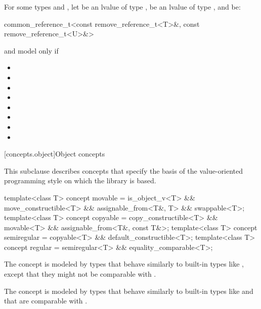 \begin{itemdescr}
\pnum
For some types  and ,
let  be an lvalue of type ,
 be an lvalue of type ,
and  be:
\begin{codeblock}
common_reference_t<const remove_reference_t<T>&, const remove_reference_t<U>&>
\end{codeblock}
 and  model
 only if

\begin{itemize}
\item {}
\item {}
\item {}
\item {}
\item {}
\item {}
\item {}
\item {}
\end{itemize}
\end{itemdescr}

[concepts.object]{Object concepts}

\pnum
This subclause describes concepts that specify the basis of the
value-oriented programming style on which the library is based.

%
%
%
%
\begin{itemdecl}
template<class T>
  concept movable = is_object_v<T> && move_constructible<T> &&
                    assignable_from<T&, T> && swappable<T>;
template<class T>
  concept copyable = copy_constructible<T> && movable<T> &&
                     assignable_from<T&, const T&>;
template<class T>
  concept semiregular = copyable<T> && default_constructible<T>;
template<class T>
  concept regular = semiregular<T> && equality_comparable<T>;
\end{itemdecl}

\begin{itemdescr}
\pnum
\begin{note}
The  concept is modeled by types that behave similarly
to built-in types like , except that they might not
be comparable with \tcode{==}.
\end{note}

\pnum
\begin{note}
The  concept is modeled by types that behave similarly to
built-in types like  and that are comparable with
\tcode{==}.
\end{note}
\end{itemdescr}

